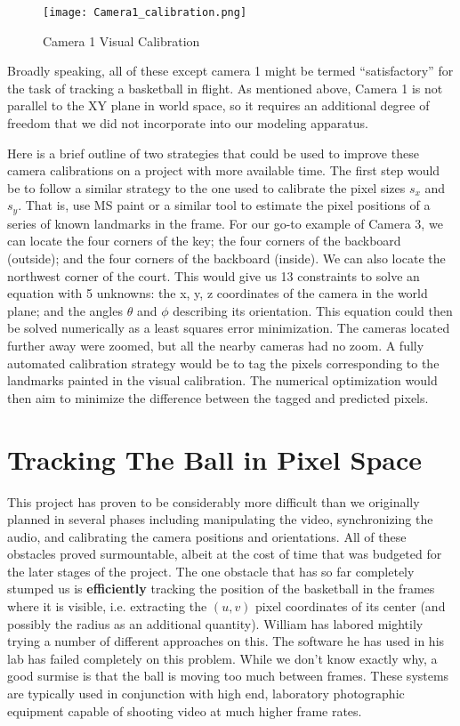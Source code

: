 \documentclass{article}
\begin{document}
\begin{figure}[H]
\texttt{[image: Camera1\_calibration.png]}
\caption*{Camera 1 Visual Calibration}
\end{figure}

Broadly speaking, all of these except camera 1 might be termed ``satisfactory''
for the task of tracking a basketball in flight.  
As mentioned above, Camera 1 is not parallel to the XY plane in world space,
so it requires an additional degree of freedom that we did not incorporate into
our modeling apparatus.

Here is a brief outline of two strategies that could be used to improve these camera
calibrations on a project with more available time.  The first step would be to 
follow a similar strategy to the one used to calibrate the pixel sizes $s_x$ and $s_y$.
That is, use MS paint or a similar tool to estimate the pixel positions of a series of 
known landmarks in the frame.  For our go-to example of Camera 3, 
we can locate the four corners of the key; the four corners of the backboard
(outside); and the four corners of the backboard (inside).  
We can also locate the northwest corner of the court.
This would give us 13 constraints to solve an equation with 5 unknowns:
the x, y, z coordinates of the camera in the world plane; 
and the angles $\theta$ and $\phi$ describing its orientation.
This equation could then be solved numerically as a least squares error minimization.
The cameras located further away were zoomed, but all the nearby cameras had no zoom.
A fully automated calibration strategy would be to tag the pixels corresponding to the landmarks
painted in the visual calibration.  
The numerical optimization would then aim to minimize the difference between the tagged
and predicted pixels.

\newpage
\section{Tracking The Ball in Pixel Space}
This project has proven to be considerably more difficult than we originally planned in several phases
including manipulating the video, synchronizing the audio, and calibrating the camera positions and orientations.   
All of these obstacles proved surmountable, albeit at the cost of time that was budgeted for the later stages of the project.
The one obstacle that has so far completely stumped us is \textbf{efficiently} 
tracking the position of the basketball in the frames where it is visible, 
i.e. extracting the $(u, v)$ pixel coordinates of its center (and possibly the radius as an additional quantity).
William has labored mightily trying a number of different approaches on this.
The software he has used in his lab has failed completely on this problem.
While we don't know exactly why, a good surmise is that the ball is moving too much between frames.
These systems are typically used in conjunction with high end, 
laboratory photographic equipment capable of shooting video at much higher frame rates.
\end{document}
